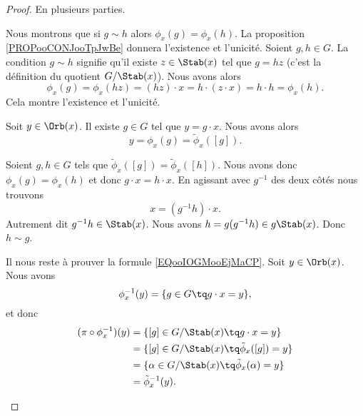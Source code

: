 \begin{proof}
	En plusieurs parties.
	\begin{subproof}
		Nous montrons que si \( g\sim h\) alors \( \phi_x(g)=\phi_x(h)\). La proposition \ref{PROPooCONJooTpJwBe} donnera l'existence et l'unicité. Soient \( g,h\in G\). La condition \( g\sim h\) signifie qu'il existe \( z\in\Stab(x)\) tel que \( g=hz\) (c'est la définition du quotient \( G/\Stab(x)\)). Nous avons alors
		\begin{equation}
			\phi_x(g)=\phi_x(hz)=(hz)\cdot x=h\cdot(z\cdot x)=h\cdot h=\phi_x(h).
		\end{equation}
		Cela montre l'existence et l'unicité.

		\spitem[Surjective]
		Soit \( y\in \Orb(x)\). Il existe \( g\in G\) tel que \( y=g\cdot x\). Nous avons alors
		\begin{equation}
			y=\phi_x(g)=\tilde \phi_x([g]).
		\end{equation}

		\spitem[Injective]
		Soient \( g,h\in G\) tels que \( \tilde \phi_x([g])=\tilde \phi_x([h])\). Nous avons donc \( \phi_x(g)=\phi_x(h)\) et donc \( g\cdot x=h\cdot x\). En agissant avec \( g^{-1}\) des deux côtés nous trouvons
		\begin{equation}
			x=(g^{-1}h)\cdot x.
		\end{equation}
		Autrement dit \( g^{-1}h\in \Stab(x)\). Nous avons \(h=g(g^{-1} h)\in g\Stab(x)\). Donc \( h\sim g\).

		\spitem[Inverse]
		Il nous reste à prouver la formule \eqref{EQooIOGMooEjMaCP}. Soit \( y\in\Orb(x)\). Nous avons
		\begin{equation}
			\phi_x^{-1}(y)=\{ g\in G\tq g\cdot x=y \},
		\end{equation}
		et donc
		\begin{subequations}
			\begin{align}
				(\pi\circ\phi_x^{-1})(y) & =\{ [g]\in G/\Stab(x)\tq g\cdot x=y \}                \\
				                         & =\{ [g]\in G/\Stab(x)\tq  \tilde \phi_x([g])  =y \}   \\
				                         & =\{ \alpha\in G/\Stab(x)\tq\tilde \phi_x(\alpha)=y \} \\
				                         & =\tilde \phi_x^{-1}(y).
			\end{align}
		\end{subequations}
	\end{subproof}
\end{proof}


